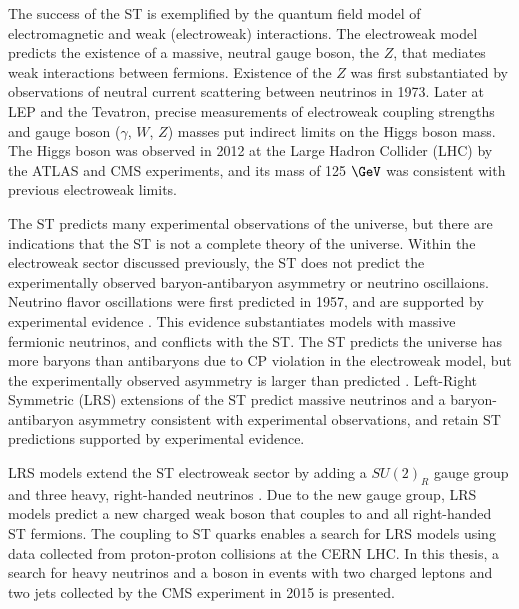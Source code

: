 The success of the ST is exemplified by the quantum field model of electromagnetic and weak (electroweak) 
interactions.  The electroweak model predicts the existence of a massive, neutral gauge boson, the $Z$, 
that mediates weak interactions between fermions.  Existence of the $Z$ was first substantiated by 
observations of neutral current scattering between neutrinos \cite{nuScattering} in 1973.  Later at 
LEP and the Tevatron, precise measurements of electroweak coupling strengths and gauge boson ($\gamma$, $W$, $Z$) 
masses put indirect limits on the Higgs boson mass.  The Higgs boson was observed in 2012 at the Large Hadron Collider 
(LHC) by the ATLAS and CMS experiments, and its mass\cite{combinedHiggsResult} of 125 $\GeV$ was consistent 
with previous electroweak limits.

The ST predicts many experimental observations of the universe, but there are indications that the ST is 
not a complete theory of the universe.  Within the electroweak sector discussed previously, the ST does 
not predict the experimentally observed baryon-antibaryon asymmetry or neutrino oscillaions.  Neutrino flavor 
oscillations were first predicted in 1957, and are supported by experimental evidence 
\cite{kamiokandeTwo,solarNuSummary,NOvAresults,mainzPhaseIIResults,t2kResults}.  This evidence substantiates 
models with massive fermionic neutrinos, and conflicts with the ST.  The ST predicts the universe has more 
baryons than antibaryons due to CP violation in the electroweak model, but the experimentally observed 
asymmetry is larger than predicted \cite{surveyOfExtensions}.  Left-Right Symmetric (LRS) extensions of 
the ST predict massive neutrinos and a baryon-antibaryon asymmetry consistent with experimental observations, 
and retain ST predictions supported by experimental evidence.

LRS models extend the ST electroweak sector by adding a $SU(2)_{R}$ gauge group and three heavy, right-handed 
neutrinos \nul.  Due to the new gauge group, LRS models predict a new charged weak boson \WR that couples to 
\nul and all right-handed ST fermions.  The \WR coupling to ST quarks enables a search for LRS models using 
data collected from proton-proton collisions at the CERN LHC.  In this thesis, a search for heavy neutrinos \nul 
and a \WR boson in events with two charged leptons and two jets collected by the CMS experiment in 2015 
is presented.

